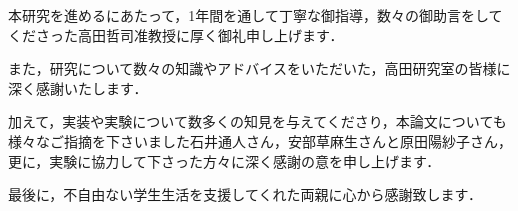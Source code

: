 \begin{ackn}{}

本研究を進めるにあたって，1年間を通して丁寧な御指導，数々の御助言をしてくださった高田哲司准教授に厚く御礼申し上げます．

また，研究について数々の知識やアドバイスをいただいた，高田研究室の皆様に深く感謝いたします．

加えて，実装や実験について数多くの知見を与えてくださり，本論文についても様々なご指摘を下さいました石井通人さん，安部草麻生さんと原田陽紗子さん，更に，実験に協力して下さった方々に深く感謝の意を申し上げます．

最後に，不自由ない学生生活を支援してくれた両親に心から感謝致します．

\end{ackn}{}
\newpage
